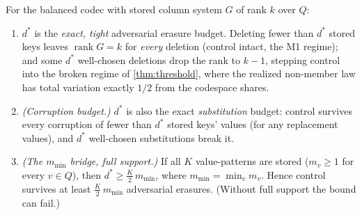 \documentclass[acmsmall,review]{acmart}
\DeclareMathOperator{\rank}{rank}
\newcommand{\Quot}{Q}                       %
\begin{document}
\begin{theorem}
\label{thm:cogirth}
For the balanced codec with stored column system $G$ of rank $k$ over $\Quot$:
\begin{enumerate}
  \item $d^\ast$ is the \emph{exact, tight} adversarial erasure budget. Deleting fewer
  than $d^\ast$ stored keys leaves $\rank G = k$ for \emph{every} deletion (control intact,
  the M1 regime); and some $d^\ast$ well-chosen deletions drop the rank to $k-1$, stepping
  control into the broken regime of \cref{thm:threshold}, where the realized non-member law
  has total variation exactly $1/2$ from the codespace shares.
  \item \emph{(Corruption budget.)} $d^\ast$ is also the exact \emph{substitution} budget:
  control survives every corruption of fewer than $d^\ast$ stored keys' values (for any
  replacement values), and $d^\ast$ well-chosen substitutions break it.
  \item \emph{(The $m_{\min}$ bridge, full support.)} If all $K$ value-patterns are stored
  ($m_v \ge 1$ for every $v \in \Quot$), then $d^\ast \ge \tfrac{K}{2}\, m_{\min}$, where
  $m_{\min} = \min_v m_v$. Hence control survives at least $\tfrac{K}{2}\,m_{\min}$
  adversarial erasures. (Without full support the bound can fail.)
\end{enumerate}
\end{theorem}
\end{document}
